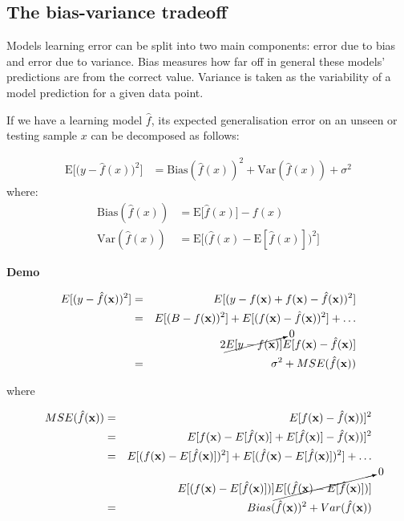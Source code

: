 \subsection{The bias-variance tradeoff}

Models learning error can be split into two main components: error due to bias and error due to variance. Bias measures how far off in general these models' predictions are from the correct value. Variance is taken as the variability of a model prediction for a given data point.

If we have a learning model $\hat{f}$, its expected generalisation error on an unseen or testing sample $x$ can be decomposed as follows:

\begin{align}
\mathrm{E}\Big[\big(y - \hat{f}(x)\big)^2\Big]
 & = \mathrm{Bias}(\hat{f}(x))^2 + \mathrm{Var}(\hat{f}(x)) + \sigma^2
\end{align}
\noindent where:
\begin{align*}
 \mathrm{Bias}(\hat{f}(x)) &= \mathrm{E}\big[\hat{f}(x)\big] - f(x) \\
 \mathrm{Var}(\hat{f}(x)) &= \mathrm{E}\Big[ \big( \hat{f}(x) - \mathrm{E}[\hat{f}(x)] \big)^2 \Big] 
\end{align*}


\textbf{Demo}\quad

\begin{eqnarray*}
E[(y-\hat{f}(\mathbf{x}))^2] & =&
E[(y-f(\mathbf{x})+f(\mathbf{x})-\hat{f}(\mathbf{x}))^2] \\
&=& E[(B-f(\mathbf{x}))^2] +
E[(f(\mathbf{x})-\hat{f}(\mathbf{x}))^2] + \dots \\
& &
2\cancelto{0}{E[y-f(\mathbf{x})]}E[f(\mathbf{x})-\hat{f}(\mathbf{x})] \\
&=& \sigma^2 + MSE(\hat{f}(\mathbf{x}))
\end{eqnarray*}

\noindent where 

\begin{eqnarray*}
    MSE(\hat{f}(\mathbf{x})) &=&
    E[f(\mathbf{x})-\hat{f}(\mathbf{x}))]^2 \\
    &=& E[f(\mathbf{x})-E[\hat{f}(\mathbf{x})] +
    E[\hat{f}(\mathbf{x})]-\hat{f}(\mathbf{x}))]^2 \\
    &=&  E[(f(\mathbf{x})-E[\hat{f}(\mathbf{x})])^2] +
      E[(\hat{f}(\mathbf{x})-E[\hat{f}(\mathbf{x})])^2] + \dots\\
    & & E[(f(\mathbf{x})-E[\hat{f}(\mathbf{x})])] 
    \cancelto{0}{E[(\hat{f}(\mathbf{x})-E[\hat{f}(\mathbf{x})])]} \\
    &=& Bias(\hat{f}(\mathbf{x}))^2 + Var(\hat{f}(\mathbf{x}))
\end{eqnarray*}

